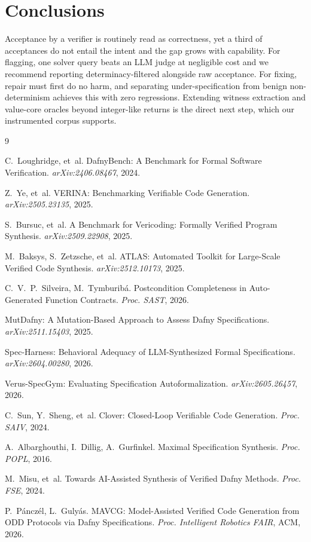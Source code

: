 \documentclass{esannV2}
\begin{document}
\section{Conclusions}

Acceptance by a verifier is routinely read as correctness, yet a third of
acceptances do not entail the intent and the gap grows with capability. For
flagging, one solver query beats an LLM judge at negligible cost and we recommend
reporting determinacy-filtered alongside raw acceptance. For fixing, repair must
first do no harm, and separating under-specification from benign non-determinism
achieves this with zero regressions. Extending witness extraction and value-core
oracles beyond integer-like returns is the direct next step, which our
instrumented corpus supports.

\begin{thebibliography}{9}
\scriptsize\setlength{\itemsep}{-3.4pt}

 C.~Loughridge, et~al. DafnyBench: A Benchmark for Formal
Software Verification. \emph{arXiv:2406.08467}, 2024.

 Z.~Ye, et~al. VERINA: Benchmarking Verifiable Code Generation.
\emph{arXiv:2505.23135}, 2025.

 S.~Bursuc, et~al. A Benchmark for Vericoding: Formally
Verified Program Synthesis. \emph{arXiv:2509.22908}, 2025.

 M.~Baksys, S.~Zetzsche, et~al. ATLAS: Automated Toolkit for
Large-Scale Verified Code Synthesis. \emph{arXiv:2512.10173}, 2025.

 C.~V.~P.~Silveira, M.~Tymburib\'a. Postcondition Completeness in
Auto-Generated Function Contracts. \emph{Proc. SAST}, 2026.

 MutDafny: A Mutation-Based Approach to Assess Dafny
Specifications. \emph{arXiv:2511.15403}, 2025.

 Spec-Harness: Behavioral Adequacy of LLM-Synthesized Formal
Specifications. \emph{arXiv:2604.00280}, 2026.

 Verus-SpecGym: Evaluating Specification Autoformalization.
\emph{arXiv:2605.26457}, 2026.

 C.~Sun, Y.~Sheng, et~al. Clover: Closed-Loop
Verifiable Code Generation. \emph{Proc. SAIV}, 2024.

 A.~Albarghouthi, I.~Dillig, A.~Gurfinkel. Maximal Specification
Synthesis. \emph{Proc. POPL}, 2016.

 M.~Misu, et~al. Towards AI-Assisted Synthesis of Verified
Dafny Methods. \emph{Proc. FSE}, 2024.

 P.~P\'ancz\'el, L.~Guly\'as. MAVCG: Model-Assisted Verified Code
Generation from ODD Protocols via Dafny Specifications.
\emph{Proc. Intelligent Robotics FAIR}, ACM, 2026.

\end{thebibliography}
\end{document}
